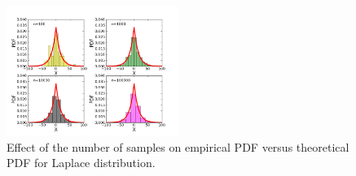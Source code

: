 \documentclass[10pt]{book}
\begin{document}
{\beforefig
\begin{figure}[h!]
  \centering
    \includegraphics[width=0.5\textwidth]{images/laplace_rand.png}
  \caption{Effect of the number of samples on empirical PDF versus theoretical PDF for Laplace distribution.}
   \label{fig:pdf_laplace_n}
\end{figure}
\afterfig

}
\end{document}
